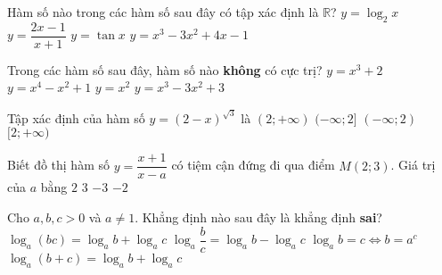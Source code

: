 \begin{ex}%
Hàm số nào trong các hàm số sau đây có tập xác định là $\mathbb R$?
\choice
{$y=\log_2x$}
{$y=\dfrac{2x-1}{x+1}$}
{$y=\tan x$}
{\True $y=x^3-3x^2+4x-1$}
\end{ex}

\begin{ex}%
Trong các hàm số sau đây, hàm số nào {\bf không} có cực trị?
\choice
{\True $y=x^3+2$}
{$y=x^4-x^2+1$}
{$y=x^2$}
{$y=x^3-3x^2+3$}
\end{ex}

\begin{ex}%
Tập xác định của hàm số $y=(2-x)^{\sqrt3}$ là
\choice
{$(2;+\infty)$}
{$(-\infty;2]$}
{\True $(-\infty;2)$}
{$[2;+\infty)$}
\end{ex}

\begin{ex}%
Biết đồ thị hàm số $y=\dfrac{x+1}{x-a}$ có tiệm cận đứng đi qua điểm $M(2;3)$. Giá trị của $a$ bằng 
\choice
{\True $2$}
{$3$}
{$-3$}
{$-2$}
\end{ex}

\begin{ex}%
Cho $a,b,c>0$ và $a\ne1$. Khẳng định nào sau đây là khẳng định {\bf sai}?
\choice
{$\log_a(bc)=\log_ab+\log_ac$}
{$\log_a\dfrac{b}{c}=\log_ab-\log_ac$}
{$\log_ab=c\Leftrightarrow b=a^c$}
{\True $\log_a(b+c)=\log_ab+\log_ac$}
\end{ex}

